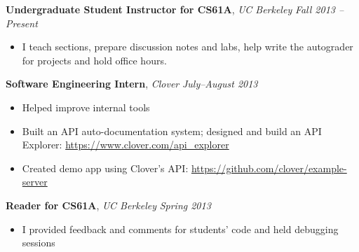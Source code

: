\documentclass[9pt]{article}
\newenvironment{changemargin}[2]{%
  \begin{list}{}{%
      \setlength{\topsep}{0pt}%
      \setlength{\leftmargin}{#1}%
      \setlength{\rightmargin}{#2}%
      \setlength{\listparindent}{\parindent}%
      \setlength{\itemindent}{\parindent}%
      \setlength{\parsep}{\parskip}%
    }%
  \item[]}{\end{list}
}
\newenvironment{body} {
  \vspace*{-16pt}
  \begin{changemargin}{-0.25in}{-0.5in}
  }
  {\end{changemargin}
}
\begin{document}
\begin{body}
  \vspace{14pt}
  \textbf{Undergraduate Student Instructor for CS61A}, \emph{UC Berkeley} \hfill \emph{Fall 2013 -- Present}\\
  \vspace*{-4pt}
  \begin{itemize} \itemsep -0pt  %
  \item I teach sections, prepare discussion notes and labs, help write the
    autograder for projects and hold office hours.
  \end{itemize}

  \textbf{Software Engineering Intern}, \emph{Clover} \hfill \emph{July--August 2013}\\
  \vspace*{-4pt}
  \begin{itemize} \itemsep -0pt  %
  \item Helped improve internal tools
  \item Built an API auto-documentation system; designed and build an API Explorer: \url{https://www.clover.com/api_explorer}
  \item Created demo app using Clover's API: \url{https://github.com/clover/example-server}
  \end{itemize}

  \textbf{Reader for CS61A}, \emph{UC Berkeley} \hfill \emph{Spring 2013}\\
  \vspace*{-4pt}
  \begin{itemize} \itemsep -0pt  %
  \item I provided feedback and comments for students' code and held debugging sessions
  \end{itemize}


\end{body}
\end{document}
